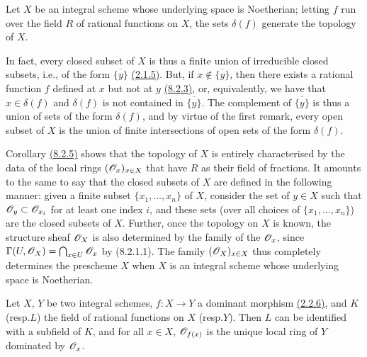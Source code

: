 \begin{cor}[8.2.5]
\label{cor-1.8.2.5}
Let $X$ be an integral scheme whose underlying
space is Noetherian; letting $f$ run over the field $R$ of rational functions on
$X$, the sets $\delta(f)$ generate the topology of $X$.
\end{cor}

In fact, every closed subset of $X$ is thus a finite union of irreducible closed
subsets, i.e., of the form $\overline{\{y\}}$ \hyperref[prop-1.2.1.5]{(2.1.5)}. But, if
$x\not\in\overline{\{y\}}$, then there exists a rational function $f$ defined at
$x$ but not at $y$ \hyperref[cor-1.8.2.3]{(8.2.3)}, or, equivalently, we have that $x\in\delta(f)$
and $\delta(f)$ is not contained in $\overline{\{y\}}$. The complement of
$\overline{\{y\}}$ is thus a union of sets of the form $\delta(f)$, and by
virtue of the first remark, every open subset of $X$ is the union of finite
intersections of open sets of the form $\delta(f)$.

\begin{env}[8.2.6]
\label{env-1.8.2.6}
Corollary \hyperref[cor-1.8.2.5]{(8.2.5)} shows that the topology of $X$ is
entirely characterised by the data of the local rings $(\mathscr{O}_x)_{x\in X}$ that
have $R$ as their field of fractions. It amounts to the same to say that the
closed subsets of $X$ are defined in the following manner: given a finite subset
$\{x_1,\ldots,x_n\}$ of $X$, consider the set of $y\in X$ such that
$\mathscr{O}_y\subset\mathscr{O}_{x_i}$ for at least one index $i$, and these sets (over all
choices of $\{x_1,\ldots,x_n\}$) are the closed subsets of $X$. Further, once
the topology on $X$ is known, the structure sheaf $\mathscr{O}_X$ is also determined by
the family of the $\mathscr{O}_x$, since $\Gamma(U,\mathscr{O}_X)=\bigcap_{x\in U}\mathscr{O}_x$ by
(8.2.1.1). The family $(\mathscr{O}_X)_{x\in X}$ thus completely determines the
prescheme $X$ when $X$ is an integral scheme whose underlying space is
Noetherian.
\end{env}

\begin{prop}[8.2.7]
\label{prop-1.8.2.7}
Let $X$, $Y$ be two integral schemes, $f:X\to Y$ a dominant morphism
\hyperref[env-1.2.2.6]{(2.2.6)}, and $K$ (resp.$L$) the field of rational
functions on $X$ (resp.$Y$). Then $L$ can be identified with a subfield of
$K$, and for all $x\in X$, $\mathscr{O}_{f(x)}$ is the unique local ring of $Y$ dominated
by $\mathscr{O}_x$.
\end{prop}

